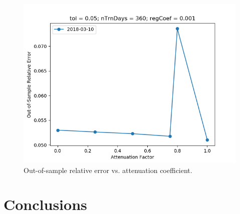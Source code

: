 \documentclass{article}
\begin{document}
\begin{figure}\label{fig:atnFct-sensitivity-oos-error}
\includegraphics[width = \textwidth]{figures/atnFct-sensitivity-oos-error.png}
\caption{Out-of-sample relative error vs. attenuation coefficient.}
\end{figure}

\section{Conclusions}\label{section:conclusions}



\end{document}

